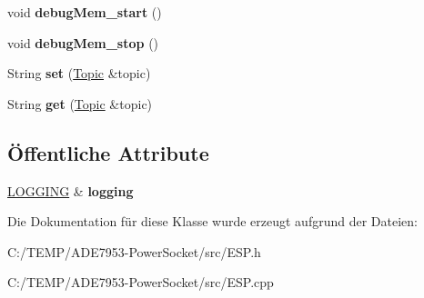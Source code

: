 \begin{DoxyCompactItemize}
void {\bfseries debug\+Mem\+\_\+start} ()
\item 
\mbox{\label{class_e_s_p___tools_a30a2c631435b5bb7066839d2532c686a}} 
void {\bfseries debug\+Mem\+\_\+stop} ()
\item 
\mbox{\label{class_e_s_p___tools_a0e95eaa209b695d19b8bb31466fa77d5}} 
String {\bfseries set} (\hyperlink{class_topic}{Topic} \&topic)
\item 
\mbox{\label{class_e_s_p___tools_a10544c0725aa195f19f84aa508d38934}} 
String {\bfseries get} (\hyperlink{class_topic}{Topic} \&topic)
\end{DoxyCompactItemize}
\subsection*{Öffentliche Attribute}
\begin{DoxyCompactItemize}
\item 
\mbox{\label{class_e_s_p___tools_ade73ea9f572dde9f86fd77f5caf10772}} 
\hyperlink{class_l_o_g_g_i_n_g}{L\+O\+G\+G\+I\+NG} \& {\bfseries logging}
\end{DoxyCompactItemize}


Die Dokumentation für diese Klasse wurde erzeugt aufgrund der Dateien\+:\begin{DoxyCompactItemize}
\item 
C\+:/\+T\+E\+M\+P/\+A\+D\+E7953-\/\+Power\+Socket/src/E\+S\+P.\+h\item 
C\+:/\+T\+E\+M\+P/\+A\+D\+E7953-\/\+Power\+Socket/src/E\+S\+P.\+cpp\end{DoxyCompactItemize}
